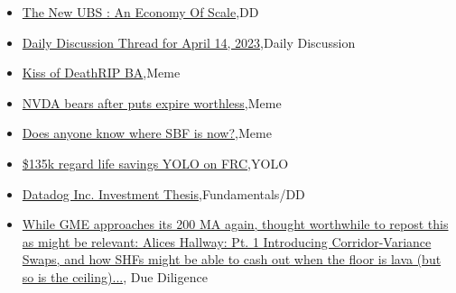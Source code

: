 \documentclass{article}%
\begin{document}
%
\begin{itemize}%
\item%
\href{https://reddit.com/r/wallstreetbets/comments/12lu1gu/the\_new\_ubs\_an\_economy\_of\_scale/}{The New UBS : An Economy Of Scale},DD%
\item%
\href{https://reddit.com/r/wallstreetbets/comments/12lrws5/daily\_discussion\_thread\_for\_april\_14\_2023/}{Daily Discussion Thread for April 14, 2023},Daily Discussion%
\item%
\href{https://reddit.com/r/wallstreetbets/comments/12lkhrs/kiss\_of\_deathrip\_ba/}{Kiss of DeathRIP BA},Meme%
\item%
\href{https://reddit.com/r/wallstreetbets/comments/12lkg50/nvda\_bears\_after\_puts\_expire\_worthless/}{NVDA bears after puts expire worthless},Meme%
\item%
\href{https://reddit.com/r/wallstreetbets/comments/12lhx5v/does\_anyone\_know\_where\_sbf\_is\_now/}{Does anyone know where SBF is now?},Meme%
\item%
\href{https://reddit.com/r/wallstreetbets/comments/12lh3eg/135k\_regard\_life\_savings\_yolo\_on\_frc/}{\$135k regard life savings YOLO on FRC},YOLO%
\item%
\href{https://reddit.com/r/StockMarket/comments/12lu0z1/datadog\_inc\_investment\_thesis/}{Datadog Inc. Investment Thesis},Fundamentals/DD%
\item%
\href{https://reddit.com/r/Superstonk/comments/12luzc5/while\_gme\_approaches\_its\_200\_ma\_again\_thought/}{While GME approaches its 200 MA again, thought worthwhile to repost this as might be relevant: Alices Hallway: Pt. 1 Introducing Corridor-Variance Swaps, and how SHFs might be able to cash out when the floor is lava (but so is the ceiling)...}, Due Diligence%
\end{itemize}%
\end{document}
